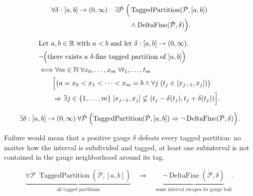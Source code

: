 \begin{remark*}
\[
\begin{aligned}
\forall \delta:[a,b]\to(0,\infty)\quad
\exists \dot{\mathcal{P}}\;\Bigl(
&\operatorname{TaggedPartition}(\dot{\mathcal{P}},[a,b])\\
&\land
\operatorname{DeltaFine}(\dot{\mathcal{P}},\delta)
\Bigr).
\end{aligned}
\]
\end{remark*}

\begin{remark*}
\[
\begin{aligned}
&\text{Let } a,b \in \mathbb{R} \text{ with } a < b \text{ and let } \delta:[a,b]\to(0,\infty).\\
&\neg\Bigl(\text{there exists a }\delta\text{-fine tagged partition of }[a,b]\Bigr)\\
&\Longleftrightarrow
\forall m \in \mathbb{N}\;\forall x_0,\ldots,x_m\;\forall t_1,\ldots,t_m\\
&\qquad\Bigl[
\bigl(a=x_0<x_1<\cdots<x_m=b
\land \forall j\;(t_j\in[x_{j-1},x_j])\bigr)\\
&\qquad\Rightarrow
\exists j\in\{1,\ldots,m\}\;
[x_{j-1},x_j]\nsubseteq(t_j-\delta(t_j),t_j+\delta(t_j))
\Bigr].
\end{aligned}
\]
\end{remark*}

\begin{remark*}
\[
\exists \delta:[a,b]\to(0,\infty)\;
\forall \dot{\mathcal{P}}\;\Bigl(
\operatorname{TaggedPartition}(\dot{\mathcal{P}},[a,b])
\Rightarrow
\neg\operatorname{DeltaFine}(\dot{\mathcal{P}},\delta)
\Bigr).
\]
\end{remark*}

\begin{remark*}
Failure would mean that a positive gauge $\delta$ defeats every tagged
partition: no matter how the interval is subdivided and tagged, at least
one subinterval is not contained in the gauge neighborhood around its tag.
\end{remark*}

\begin{remark*}
\[
\underbrace{\forall \dot{\mathcal{P}}\;
\operatorname{TaggedPartition}(\dot{\mathcal{P}},[a,b])}_{\text{all tagged partitions}}
\quad\Rightarrow\quad
\underbrace{\neg\operatorname{DeltaFine}(\dot{\mathcal{P}},\delta)}_{\text{some interval escapes its gauge ball}}.
\]
\end{remark*}

